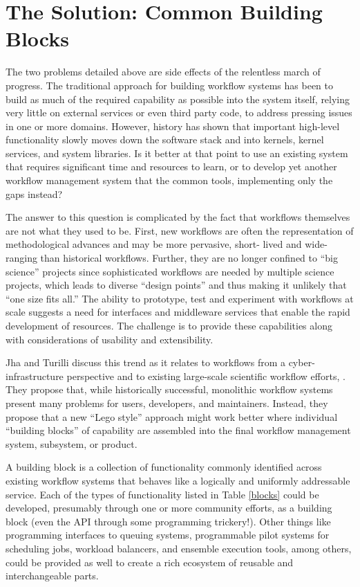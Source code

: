 \section{The Solution: Common Building Blocks}\label{buildings-blocks}

The two problems detailed above are side effects of the relentless march of
progress. The traditional approach for building workflow systems has been to
build as much of the required capability as possible into the system itself,
relying very little on external services or even third party code, to address
pressing issues in one or more domains. However, history has shown that
important high-level functionality slowly moves down the software stack and
into kernels, kernel services, and system libraries. Is it better at that
point to use an existing system that requires significant time and resources
to learn, or to develop yet another workflow management system that the common
tools, implementing only the gaps instead?

The answer to this question is complicated by the fact that workflows
themselves are not what they used to be. First, new workflows are often the
representation of methodological advances and may be more pervasive,  short-
lived and wide-ranging than historical workflows. Further, they are no longer
confined to ``big science'' projects since sophisticated workflows are needed
by multiple science projects, which leads to diverse “design points” and thus
making it unlikely that ``one size fits all.''  The ability to prototype, test
and experiment with workflows at scale suggests a need for interfaces and
middleware services that enable the rapid development of resources. The
challenge is to provide these capabilities along with considerations of
usability and extensibility.

Jha and Turilli discuss this trend as it relates to workflows from a cyber-
infrastructure perspective and to existing large-scale scientific workflow
efforts, \cite{jha_building_2016}. They propose that, while historically
successful, monolithic workflow systems present many problems for users,
developers, and maintainers. Instead, they propose that a new ``Lego style''
approach might work better where individual ``building blocks'' of capability
are assembled into the final workflow management system, subsystem, or
product.

A building block is a collection of functionality commonly identified across
existing workflow systems that behaves like a logically and uniformly
addressable service. Each of the types of functionality listed in Table
\ref{blocks} could be developed, presumably through one or more community
efforts, as a building block (even the API through some programming
trickery!). Other things like programming interfaces to queuing systems,
programmable pilot systems for scheduling jobs, workload balancers, and
ensemble execution tools, among others, could be provided as well to create a
rich ecosystem of reusable and interchangeable parts.

